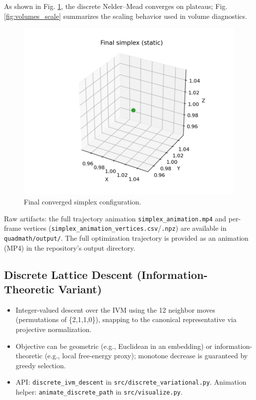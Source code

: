 \documentclass[
]{article}
\providecommand{\tightlist}{%
  \setlength{\itemsep}{0pt}\setlength{\parskip}{0pt}}
\begin{document}
As shown in Fig. \ref{fig:simplex_final}, the discrete Nelder--Mead
converges on plateaus; Fig. \ref{fig:volumes_scale} summarizes the
scaling behavior used in volume diagnostics.

\begin{figure}
\hypertarget{fig:simplex_final}{%
\centering
\includegraphics{../output/figures/simplex_final.png}
\caption{Final converged simplex
configuration.}\label{fig:simplex_final}
}
\end{figure}

Raw artifacts: the full trajectory animation
\texttt{simplex\_animation.mp4} and per-frame vertices
(\texttt{simplex\_animation\_vertices.csv}/\texttt{.npz}) are available
in \texttt{quadmath/output/}. The full optimization trajectory is
provided as an animation (MP4) in the repository's output directory.

\hypertarget{discrete-lattice-descent-information-theoretic-variant}{%
\subsection{Discrete Lattice Descent (Information-Theoretic
Variant)}\label{discrete-lattice-descent-information-theoretic-variant}}

\begin{itemize}
\tightlist
\item
  Integer-valued descent over the IVM using the 12 neighbor moves
  (permutations of \{2,1,1,0\}), snapping to the canonical
  representative via projective normalization.
\item
  Objective can be geometric (e.g., Euclidean in an embedding) or
  information-theoretic (e.g., local free-energy proxy); monotone
  decrease is guaranteed by greedy selection.
\item
  API: \texttt{discrete\_ivm\_descent} in
  \texttt{src/discrete\_variational.py}. Animation helper:
  \texttt{animate\_discrete\_path} in \texttt{src/visualize.py}.
\end{itemize}
\end{document}
